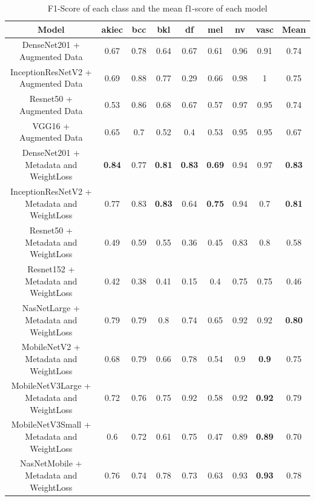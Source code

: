 \documentclass[sensors,article,submit,pdftex,moreauthors]{Definitions/mdpi}
\begin{document}
\begin{table}[h]
	\centering
	\begin{tabular}{|c | c | c | c | c | c | c | c | c|} 
		\hline
		Model & akiec & bcc & bkl & df & mel & nv & vasc & Mean \\
		\hline
		\thead{DenseNet201 +\\ Augmented Data} & 0.67 & 0.78 & 0.64 & 0.67 & 0.61 & 0.96 & 0.91 & 0.74 \\ 
		\hline
		\thead{InceptionResNetV2 +\\ Augmented Data} & 0.69 &	0.88 & 0.77 & 0.29 & 0.66 & 0.98 & 1 & 0.75\\
		\hline
		\thead{Resnet50 +\\ Augmented Data} & 0.53 & 0.86 & 0.68 & 0.67 & 0.57 & 0.97 & 0.95 & 0.74\\
		\hline 	
		\thead{VGG16 +\\ Augmented Data} & 0.65 & 0.7 & 0.52 & 0.4 & 0.53 & 0.95 & 0.95 & 0.67\\ 
		\hline		
		\thead{DenseNet201 +\\Metadata and WeightLoss} & \textbf{0.84} & 0.77 & \textbf{0.81} & \textbf{0.83} & \textbf{0.69} & 0.94 & 0.97 & \textbf{0.83}\\
		\hline
		\thead{InceptionResNetV2 +\\Metadata and WeightLoss} & 0.77 & 0.83 & \textbf{0.83} & 0.64 & \textbf{0.75} & 0.94 & 0.7 & \textbf{0.81}\\
		\hline
		\thead{Resnet50 +\\Metadata and WeightLoss} & 0.49 & 0.59 & 0.55 & 0.36 & 0.45 & 0.83 & 0.8 & 0.58\\
		\hline
		\thead{Resnet152 +\\Metadata and WeightLoss} & 0.42 & 0.38 & 0.41 & 0.15 & 0.4 & 0.75 & 0.75 & 0.46\\
		\hline
		\thead{NasNetLarge +\\Metadata and WeightLoss} & 0.79 & 0.79 & 0.8 & 0.74 & 0.65 & 0.92 & 0.92 & \textbf{0.80}\\
		\hline
		\thead{MobileNetV2 +\\Metadata and WeightLoss} & 0.68 & 0.79 & 0.66 & 0.78 & 0.54 & 0.9 & \textbf{0.9} & 0.75\\
		\hline
		\thead{MobileNetV3Large +\\Metadata and WeightLoss} & 0.72 & 0.76 & 0.75 & 0.92 & 0.58 & 0.92 & \textbf{0.92} & 0.79\\
		\hline
		\thead{MobileNetV3Small +\\Metadata and WeightLoss} & 0.6 & 0.72 & 0.61 & 0.75 & 0.47 & 0.89 & \textbf{0.89} & 0.70\\
		\hline
		\thead{NasNetMobile +\\Metadata and WeightLoss} & 0.76 & 0.74 & 0.78 & 0.73 & 0.63 & 0.93 & \textbf{0.93} & 0.78\\
		\hline
	\end{tabular}
	\caption{F1-Score of each class and the mean f1-score of each model}
	\label{table:5}
\end{table}
\end{document}
